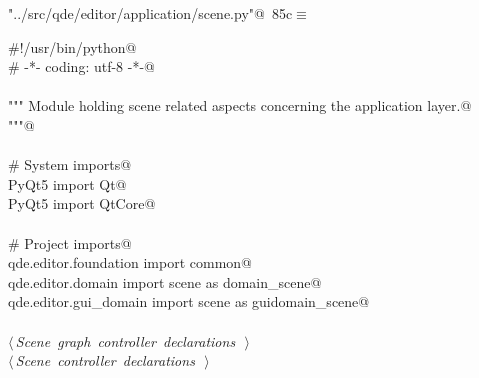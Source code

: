 \documentclass[
    a4paper,      %
    10pt,         %
    openright,    %
    notitlepage,  %
    parskip=half, %
]{scrreprt}       %
\theoremstyle{definition}                    %
\begin{document}
\begin{flushleft} \small
\begin{minipage}{\linewidth}\label{scrap140}\raggedright\small
{} \verb@"../src/qde/editor/application/scene.py"@\nobreak\ {\footnotesize {85c}}$\equiv$
\vspace{-1ex}
\begin{list}{}{} \item
\mbox{}\lstinline@#!/usr/bin/python@\\
\mbox{}\lstinline@# -*- coding: utf-8 -*-@\\
\mbox{}\lstinline@@\\
\mbox{}\lstinline@""" Module holding scene related aspects concerning the application layer.@\\
\mbox{}\lstinline@"""@\\
\mbox{}\lstinline@@\\
\mbox{}\lstinline@# System imports@\\
\mbox{}\lstinline@from PyQt5 import Qt@\\
\mbox{}\lstinline@from PyQt5 import QtCore@\\
\mbox{}\lstinline@@\\
\mbox{}\lstinline@# Project imports@\\
\mbox{}\lstinline@from qde.editor.foundation import common@\\
\mbox{}\lstinline@from qde.editor.domain     import scene as domain_scene@\\
\mbox{}\lstinline@from qde.editor.gui_domain import scene as guidomain_scene@\\
\mbox{}\lstinline@@\\
\mbox{}\lstinline@@\hbox{$\langle\,${\itshape Scene graph controller declarations}\nobreak\ {\footnotesize {}}$\,\rangle$}\lstinline@@\\
\mbox{}\lstinline@@\hbox{$\langle\,${\itshape Scene controller declarations}\nobreak\ {\footnotesize {}}$\,\rangle$}\lstinline@@\\
\mbox{}\lstinline@@{\NWsep}
\end{list}
\vspace{-1.5ex}
\footnotesize
\begin{list}{}{\setlength{\itemsep}{-\parsep}\setlength{\itemindent}{-\leftmargin}}

\item{}
\end{list}
\end{minipage}\vspace{4ex}
\end{flushleft}
\end{document}
